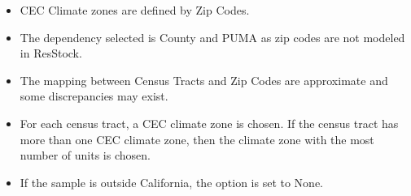 \begin{itemize}
\item CEC Climate zones are defined by Zip Codes.
\item The dependency selected is County and PUMA as zip codes are not modeled in ResStock.
\item The mapping between Census Tracts and Zip Codes are approximate and some discrepancies may exist.
\item For each census tract, a CEC climate zone is chosen. If the census tract has more than one CEC climate zone, then the climate zone with the most number of units is chosen.
\item If the sample is outside California, the option is set to None.
\end{itemize}
